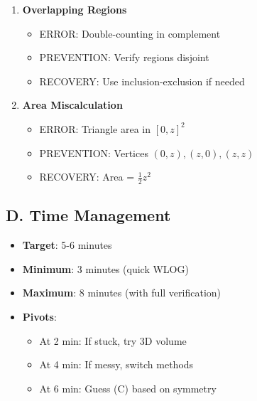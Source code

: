 \documentclass[11pt]{article}
\begin{document}
\begin{roadmapbox}
\begin{enumerate}
    \item \textbf{Overlapping Regions}
    \begin{itemize}
        \item ERROR: Double-counting in complement
        \item PREVENTION: Verify regions disjoint
        \item RECOVERY: Use inclusion-exclusion if needed
    \end{itemize}
    
    \item \textbf{Area Miscalculation}
    \begin{itemize}
        \item ERROR: Triangle area in $[0,z]^2$
        \item PREVENTION: Vertices $(0,z), (z,0), (z,z)$
        \item RECOVERY: Area = $\frac{1}{2}z^2$
    \end{itemize}
\end{enumerate}

\subsection*{D. Time Management}
\begin{itemize}
    \item \textbf{Target}: 5-6 minutes
    \item \textbf{Minimum}: 3 minutes (quick WLOG)
    \item \textbf{Maximum}: 8 minutes (with full verification)
    \item \textbf{Pivots}:
    \begin{itemize}
        \item At 2 min: If stuck, try 3D volume
        \item At 4 min: If messy, switch methods
        \item At 6 min: Guess (C) based on symmetry
    \end{itemize}
\end{itemize}
\end{roadmapbox}
\end{document}
